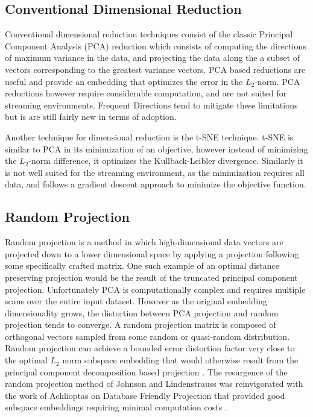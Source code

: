 \subsection{Conventional Dimensional Reduction}
Conventional dimensional reduction techniques consist of the classic Principal Component Analysis (PCA) reduction which consists of
computing the directions of maximum variance in the data, and projecting the data along the a subset of vectors
corresponding to the greatest variance vectors.  PCA based reductions are useful and provide an embedding that optimizes
the error in the $L_2$-norm.  PCA reductions however require considerable computation, and are not suited for streaming
environments.  Frequent Directions \cite{libertyfreq} tend to mitigate these limitations but is are still fairly new in terms
of adoption.

Another technique for dimensional reduction is the t-SNE \cite{tsne} technique.  t-SNE is similar to PCA in its minimization
of an objective, however instead of minimizing the $L_2$-norm difference, it optimizes the Kullback-Leibler divergence.
Similarly it is not well suited for the streaming environment, as the minimization requires all data, and follows
a gradient descent approach to minimize the objective function.

\subsection{Random Projection}
Random projection is a method in which high-dimensional data vectors are projected down to a lower dimensional space by
applying a projection following some specifically crafted matrix.  One such example of an optimal distance preserving
projection would be the result of the truncated principal component projection.  Unfortunately PCA is computationally
complex and requires multiple scans over the entire input dataset.  However as the original embedding dimensionality
grows, the distortion between PCA projection and random projection tends to converge.  A random projection matrix is
composed of orthogonal vectors sampled from some random or quasi-random distribution.  Random projection can achieve a
bounded error distortion factor very close to the optimal $L_2$ norm subspace embedding that would otherwise result from
the principal component decomposition based projection \cite{bourgain1985lipschitz}.  The resurgence of the random
projection method of Johnson and Lindenstrauss was reinvigorated with the work of Achlioptas on Database Friendly
Projection that provided good subspace embeddings requiring minimal computation costs \cite{Achlioptas01}.

